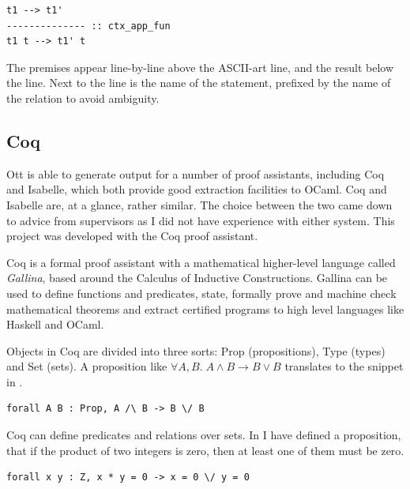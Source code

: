 \documentclass[12pt,twoside,notitlepage]{report}
\theoremstyle{plain}%
\theoremstyle{definition}
\theoremstyle{remark}
\begin{document}
\begin{lstlisting}[language={Ott}, caption={Ott single reduction}]
t1 --> t1'
-------------- :: ctx_app_fun
t1 t --> t1' t
\end{lstlisting}

The premises appear line-by-line above the ASCII-art line, and the result below the line. Next to the line is the name of the statement, prefixed by the name of the relation to avoid ambiguity. 



\subsection{Coq}
Ott is able to generate output for a number of proof assistants, including Coq and Isabelle, which both provide good extraction facilities to OCaml. Coq and Isabelle are, at a glance, rather similar. The choice between the two came down to advice from supervisors as I did not have experience with either system. This project was developed with the Coq proof assistant. 

Coq is a formal proof assistant with a mathematical higher-level language called \textit{Gallina}, based around the Calculus of Inductive Constructions. Gallina can be used to define functions and predicates, state, formally prove and machine check mathematical theorems and extract certified programs to high level languages like Haskell and OCaml.


Objects in Coq are divided into three sorts: Prop (propositions), Type (types) and Set (sets).  A proposition like $ \forall A, B.\; A \wedge B \rightarrow B \vee B $ translates to the snippet in .


\begin{lstlisting}[language={Coq},caption={Coq Prop logic example},label={lst:coqproplogex}]
forall A B : Prop, A /\ B -> B \/ B
\end{lstlisting}


Coq can define predicates and relations over sets. In  I have defined a proposition, that if the product of two integers is zero, then at least one of them must be zero.


\begin{lstlisting}[language={Coq},caption={Coq Prop predicate example},label={lst:coqpredex}]
forall x y : Z, x * y = 0 -> x = 0 \/ y = 0
\end{lstlisting}
\end{document}
